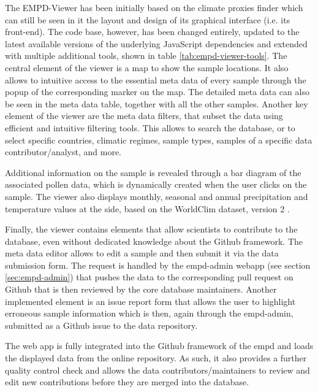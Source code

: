 \documentclass[
11pt, %
english, %
singlespacing, %
headsepline, %
]{MastersDoctoralThesis} %
\begin{document}
\begin{NoHyper}
\begin{refsection}
The EMPD-Viewer has been initially based on the climate proxies finder \citep{BollietBrockmannMassonDelmotteEtAl2016, Brockmann2016} which can still be seen in it the layout and design of its graphical interface (i.e. its front-end). The code base, however, has been changed entirely, updated to the latest available versions of the underlying JavaScript dependencies and extended with multiple additional tools, shown in table \ref{tab:empd-viewer-tools}. The central element of the viewer is a map to show the sample locations. It also allows to intuitive access to the essential meta data of every sample through the popup of the corresponding marker on the map. The detailed meta data can also be seen in the meta data table, together with all the other samples. Another key element of the viewer are the meta data filters, that subset the data using efficient and intuitive filtering tools. This allows to search the database, or to select specific countries, climatic regimes, sample types, samples of a specific data contributor/analyst, and more.

Additional information on the sample is revealed through a bar diagram of the associated pollen data, which is dynamically created when the user clicks on the sample. The viewer also displays monthly, seasonal and annual precipitation and temperature values at the side, based on the WorldClim dataset, version 2 \citep{FickHijmans2017}.

Finally, the viewer contains elements that allow scientists to contribute to the database, even without dedicated knowledge about the Github framework. The meta data editor allows to edit a sample and then submit it via the data submission form. The request is handled by the \gls{empd}-admin webapp (see section \ref{sec:empd-admin}) that pushes the data to the corresponding pull request on Github that is then reviewed by the core database maintainers. Another implemented element is an issue report form that allows the user to highlight erroneous sample information which is then, again through the \gls{empd}-admin, submitted as a Github issue to the data repository.

The web app is fully integrated into the Github framework of the \gls{empd} and loads the displayed data from the online repository. As such, it also provides a further quality control check and allows the data contributors/maintainers to review and edit new contributions before they are merged into the database.


\end{refsection}
\end{NoHyper}
\end{document}
